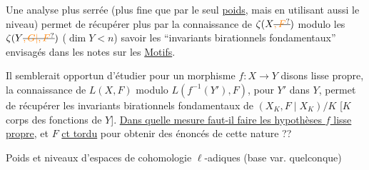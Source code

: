 Une analyse plus serrée  (plus fine que par le seul \uline{poids}, mais en utilisant aussi le niveau) permet de récupérer plus par la connaissance de $\zeta(X\deleted{\unsure{,F}})$  modulo les $\zeta(Y\deleted{\unsure{,G|,F}})$ ($\dim Y<n$) 
savoir les ``invariants birationnels fondamentaux''   envisagés dans les notes sur les \uline{Motifs}.

\noindent\makebox[0pt][r]{\rule[-3\baselineskip]{.35pt}{3.9\baselineskip}\hspace{2pt}\rule[-3\baselineskip]{.35pt}{3.9\baselineskip}\hspace{.55em}}Il semblerait opportun d'étudier   pour un morphisme $f:X\longrightarrow Y$ disons lisse propre,  la connaissance de  $L(X,F)$ modulo $L(f^{-1}(Y'),F)$, pour $Y'$  dans $Y$, permet de récupérer les invariants birationnels fondamentaux de $(X_K,F\mid X_K)/K$ [$K$ corps des fonctions de $Y$]. \uline{Dans quelle mesure faut-il faire les hypothèses $f$ lisse propre}, et $F$ \uline{ct tordu} pour obtenir des énoncés de cette nature ??
\noindent\begin{minipage}[t]{.16\linewidth}\vspace{0pt}
\end{minipage}\hfill\begin{minipage}[t]{.39\linewidth}\vspace{0pt}
\raggedright
Poids et niveaux d'\ignorespaces espaces de cohomologie $\ell$-adiques (base var. quelconque)
\end{minipage}
